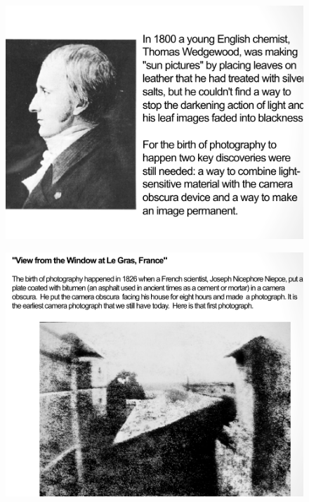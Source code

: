 \documentclass{beamer}
\begin{document}
\begin{frame}
	\begin{figure}
		\centering
		\includegraphics[scale=0.4]{75.jpg}
	\end{figure}
\end{frame}

\begin{frame}
	\begin{figure}
		\centering
		\includegraphics[scale=0.4]{76.jpg}
	\end{figure}
\end{frame}
\end{document}
